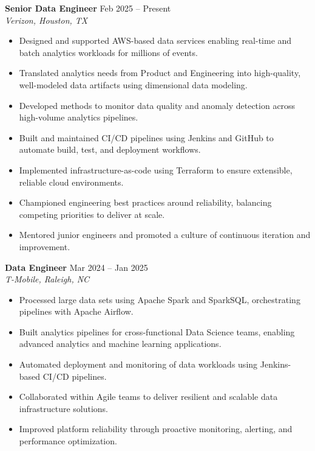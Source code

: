 \documentclass[10pt]{article}
\begin{document}
\textbf{Senior Data Engineer} \hfill Feb 2025 -- Present \\
\textit{Verizon, Houston, TX}
\begin{itemize}[leftmargin=*, itemsep=3pt]
    \item Designed and supported AWS-based data services enabling real-time and batch analytics workloads for millions of events.
    \item Translated analytics needs from Product and Engineering into high-quality, well-modeled data artifacts using dimensional data modeling.
    \item Developed methods to monitor data quality and anomaly detection across high-volume analytics pipelines.
    \item Built and maintained CI/CD pipelines using Jenkins and GitHub to automate build, test, and deployment workflows.
    \item Implemented infrastructure-as-code using Terraform to ensure extensible, reliable cloud environments.
    \item Championed engineering best practices around reliability, balancing competing priorities to deliver at scale.
    \item Mentored junior engineers and promoted a culture of continuous iteration and improvement.
\end{itemize}

\textbf{Data Engineer} \hfill Mar 2024 -- Jan 2025 \\
\textit{T-Mobile, Raleigh, NC}
\begin{itemize}[leftmargin=*, itemsep=3pt]
    \item Processed large data sets using Apache Spark and SparkSQL, orchestrating pipelines with Apache Airflow.
    \item Built analytics pipelines for cross-functional Data Science teams, enabling advanced analytics and machine learning applications.
    \item Automated deployment and monitoring of data workloads using Jenkins-based CI/CD pipelines.
    \item Collaborated within Agile teams to deliver resilient and scalable data infrastructure solutions.
    \item Improved platform reliability through proactive monitoring, alerting, and performance optimization.
\end{itemize}
\end{document}
